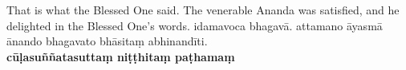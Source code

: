 \documentclass[11pt]{article}
\begin{document}
\begin{paracol}{2}
\begin{column}
\switchcolumn*
That is what the Blessed One said. The venerable Ananda was satisfied, and he delighted in the Blessed One's words.
\switchcolumn
idamavoca bhagavā. attamano āyasmā ānando bhagavato bhāsitaṃ abhinandīti.\\[.5cm]
\textbf{cūḷasuññatasuttaṃ niṭṭhitaṃ paṭhamaṃ }
\switchcolumn*

\end{column}
\end{paracol}
\end{document}
